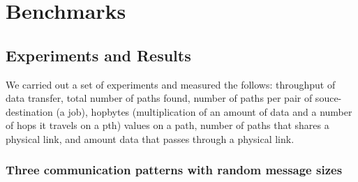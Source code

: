 \section{Benchmarks}
\label{sec:benchmark}





%



\subsection{Experiments and Results}

We carried out a set of experiments and measured the follows: throughput of data transfer, total number of paths found, number of paths per pair of souce-destination (a job), hopbytes (multiplication of an amount of data and a number of hops it travels on a pth) values on a path, number of paths that shares a physical link, and amount data that passes through a physical link.



\subsubsection {Three communication patterns with random message sizes}


%
